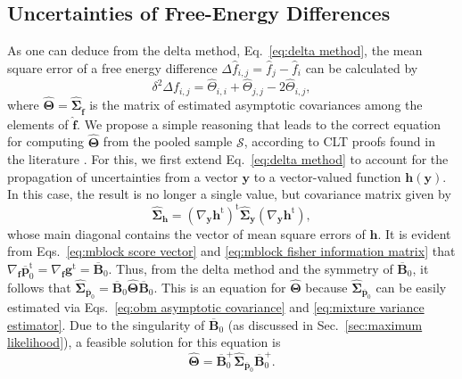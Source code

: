 \documentclass[journal=jctcce,manuscript=article,layout=twocolumn]{achemso}
\newcommand{\mt}[1]{\boldsymbol{\mathbf{#1}}}   %
\newcommand{\vt}[1]{\boldsymbol{\mathbf{#1}}}   %
\newcommand{\tr}[1]{#1^\text{t}}                %
\newcommand{\avg}[1]{\overline{#1}}             %
\begin{document}
\subsection{Uncertainties of Free-Energy Differences}
\label{sec:uncertainties of free-energy differences}

As one can deduce from the delta method, Eq.~\eqref{eq:delta method}, the mean square error of a free energy difference $\Delta \hat f_{i,j} = \hat f_j - \hat f_i$ can be calculated by
\begin{equation}
\delta^2 \Delta f_{i,j} = \hat \Theta_{i,i} + \hat \Theta_{j,j} - 2\hat \Theta_{i,j},
\end{equation}
where $\hat{\mt \Theta} = \hat{\mt \Sigma}_{\hat{\vt f}}$ is the matrix of estimated asymptotic covariances among the elements of $\hat{\vt f}$. We propose a simple reasoning that leads to the correct equation for computing $\hat{\mt \Theta}$ from the pooled sample $\mathcal S$, according to CLT proofs found in the literature \cite{Geyer_1994, Buta_2010, Buta_2011, Doss_2014}. For this, we first extend Eq.~\eqref{eq:delta method} to account for the propagation of uncertainties from a vector $\vt y$ to a vector-valued function $\vt h({\vt y})$. In this case, the result is no longer a single value, but covariance matrix given by
\begin{equation}
\label{eq:vectorial delta method}
\hat{\mt \Sigma}_{\vt h} = \tr{(\nabla_{\vt y} \tr{\vt h})} \hat{\mt \Sigma}_{\vt y}(\nabla_{\vt y} \tr{\vt h}),
\end{equation}
whose main diagonal contains the vector of mean square errors of $\vt h$. It is evident from Eqs.~\eqref{eq:mblock score vector} and \eqref{eq:mblock fisher information matrix} that $\nabla_{\vt f}\tr{\avg{\vt p}}_0 = \nabla_{\vt f}\tr{\vt g} = \avg{\mt B}_0$. Thus, from the delta method and the symmetry of $\avg{\mt B}_0$, it follows that $\hat{\mt \Sigma}_{\avg{\vt p}_0} = \avg{\mt B}_0 \hat{\mt \Theta} \avg{\mt B}_0$. This is an equation for $\hat{\mt \Theta}$ because $\hat{\mt \Sigma}_{\avg{\vt p}_0}$ can be easily estimated via Eqs.~\eqref{eq:obm asymptotic covariance} and \eqref{eq:mixture variance estimator}. Due to the singularity of $\avg{\mt B}_0$ (as discussed in Sec.~\ref{sec:maximum likelihood}), a feasible solution for this equation is
\begin{equation}
\label{eq:mblock covariance matrix}
\hat{\mt \Theta} = \avg{\mt B}_0^+  \hat{\mt \Sigma}_{\avg{\vt p}_0} \avg{\mt B}_0^+.
\end{equation}
\end{document}
